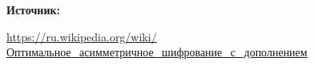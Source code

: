 \documentclass[12pt,a4paper]{scrartcl}
\begin{document}
	\textbf{Источник:}
	
	\href{https://ru.wikipedia.org/wiki/%D0%9E%D0%BF%D1%82%D0%B8%D0%BC%D0%B0%D0%BB%D1%8C%D0%BD%D0%BE%D0%B5_%D0%B0%D1%81%D0%B8%D0%BC%D0%BC%D0%B5%D1%82%D1%80%D0%B8%D1%87%D0%BD%D0%BE%D0%B5_%D1%88%D0%B8%D1%84%D1%80%D0%BE%D0%B2%D0%B0%D0%BD%D0%B8%D0%B5_%D1%81_%D0%B4%D0%BE%D0%BF%D0%BE%D0%BB%D0%BD%D0%B5%D0%BD%D0%B8%D0%B5%D0%BC}{https://ru.wikipedia.org/wiki/Оптимальное\_асимметричное\_шифрование\_с\_дополнением}
	
\end{document}
